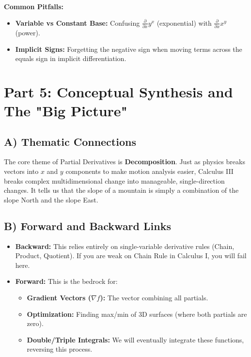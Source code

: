 \documentclass{article}
\begin{document}
\textbf{Common Pitfalls:}
\begin{itemize}
    \item \textbf{Variable vs Constant Base:} Confusing $\frac{\partial}{\partial x} y^x$ (exponential) with $\frac{\partial}{\partial x} x^y$ (power).
    \item \textbf{Implicit Signs:} Forgetting the negative sign when moving terms across the equals sign in implicit differentiation.
\end{itemize}

\section{Part 5: Conceptual Synthesis and The "Big Picture"}

\subsection{A) Thematic Connections}
The core theme of Partial Derivatives is \textbf{Decomposition}. Just as physics breaks vectors into $x$ and $y$ components to make motion analysis easier, Calculus III breaks complex multidimensional change into manageable, single-direction changes. It tells us that the slope of a mountain is simply a combination of the slope North and the slope East.

\subsection{B) Forward and Backward Links}
\begin{itemize}
    \item \textbf{Backward:} This relies entirely on single-variable derivative rules (Chain, Product, Quotient). If you are weak on Chain Rule in Calculus I, you will fail here.
    \item \textbf{Forward:} This is the bedrock for:
    \begin{itemize}
        \item \textbf{Gradient Vectors ($\nabla f$):} The vector combining all partials.
        \item \textbf{Optimization:} Finding max/min of 3D surfaces (where both partials are zero).
        \item \textbf{Double/Triple Integrals:} We will eventually integrate these functions, reversing this process.
    \end{itemize}
\end{itemize}
\end{document}
